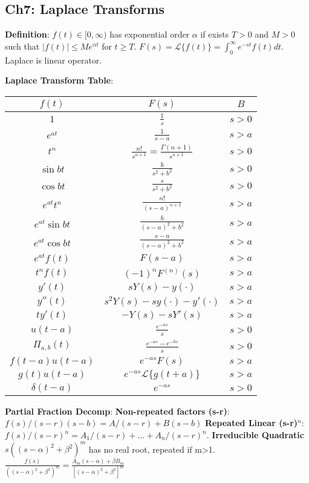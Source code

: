 \subsection*{Ch7: Laplace Transforms}

\textbf{Definition}: $f(t) \in [0, \infty)$ has exponential order $\alpha$ if exists $T>0$ and $M>0$ such that $|f(t)| \leq Me^{\alpha t}$ for $t \geq T$.
$F(s) = \mathcal{L}\{f(t)\} = \int_0^{\infty} e^{-st} f(t) dt$. 
Laplace is linear operator. 

\textbf{Laplace Transform Table}:\\
\begin{tabular}{|c|c|c|}
\hline
$f(t)$ & $F(s)$ & $B$\\
\hline
$1$ & $\frac{1}{s}$ & $s>0$ \\
$e^{at}$ & $\frac{1}{s-a}$ & $s>a$ \\
$t^n$ & $\frac{n!}{s^{n+1}}=\frac{\Gamma(n+1)}{s^{n+1}}$ & $s>0$ \\
$\sin{bt}$ & $\frac{b}{s^2 + b^2}$ & $s>0$\\
$\cos{bt}$ & $\frac{s}{s^2 + b^2}$ & $s>0$\\
$e^{at}t^n$ & $\frac{n!}{(s-a)^{n+1}}$ & $s>a$\\
$e^{at}\sin{bt}$ & $\frac{b}{(s-a)^2 + b^2}$ & $s>a$\\
$e^{at}\cos{bt}$ & $\frac{s-a}{(s-a)^2 + b^2}$ & $s>a$\\
$e^{at}f(t)$ & $F(s-a)$ & $s>a$\\
$t^nf(t)$ & $(-1)^nF^{(n)}(s)$ & $s>a$\\
$y'(t)$ & $sY(s) - y(\cdot)$ & $s>a$\\
$y''(t)$ & $s^2Y(s)-sy(\cdot) - y'(\cdot)$ & $s>a$\\
$ty'(t)$ & $-Y(s) - sY'(s)$ & $s>a$\\
\hline
$u(t-a)$ & $\frac{e^{-as}}{s}$ & $s>0$\\
$\Pi_{a,b}(t)$ & $\frac{e^{-as} - e^{-bs}}{s}$ & $s>0$\\
$f(t-a)u(t-a)$ & $e^{-as}F(s)$ & $s>a$\\
$g(t)u(t-a)$ & $e^{-as}\mathcal{L}\{g(t+a)\}$ & $s>a$\\
$\delta(t-a)$ & $e^{-as}$ & $s>0$\\
\hline
\end{tabular}

\textbf{Partial Fraction Decomp}: \textbf{Non-repeated factors (s-r)}: $f(s)/(s-r)(s-b) = A/(s-r) + B(s-b)$ 
\textbf{Repeated Linear (s-r)$^n$}: $f(s)/(s-r)^n = A_1/(s-r) + \dots + A_n/(s-r)^n$. 
\textbf{Irreducible Quadratic $s((s-\alpha)^2 + \beta^2)^m$} has no real root, repeated if m>1. 
$\frac{f(s)}{((s-\alpha)^2 + \beta^2)^m} = \frac{A_m(s-\alpha) + \beta B_m}{[(s-\alpha)^2 + \beta^2]^m}$

